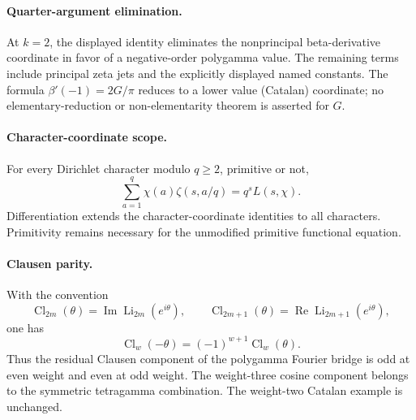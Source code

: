 \paragraph{Quarter-argument elimination.}
At $k=2$, the displayed identity eliminates the nonprincipal beta-derivative
coordinate in favor of a negative-order polygamma value. The remaining terms
include principal zeta jets and the explicitly displayed named constants.
The formula $\beta'(-1)=2G/\pi$ reduces to a lower value (Catalan) coordinate;
no elementary-reduction or non-elementarity theorem is asserted for $G$.

\paragraph{Character-coordinate scope.}
For every Dirichlet character modulo $q\geq2$, primitive or not,
\[
 \sum_{a=1}^{q}\chi(a)\zeta(s,a/q)=q^sL(s,\chi).
\]
Differentiation extends the character-coordinate identities to all characters.
Primitivity remains necessary for the unmodified primitive functional equation.

\paragraph{Clausen parity.}
With the convention
\[
 \operatorname{Cl}_{2m}(\theta)=\operatorname{Im}
       \operatorname{Li}_{2m}(e^{i\theta}),\qquad
 \operatorname{Cl}_{2m+1}(\theta)=\operatorname{Re}
       \operatorname{Li}_{2m+1}(e^{i\theta}),
\]
one has
\[
 \operatorname{Cl}_{w}(-\theta)=(-1)^{w+1}
       \operatorname{Cl}_{w}(\theta).
\]
Thus the residual Clausen component of the polygamma Fourier bridge is odd at
even weight and even at odd weight. The weight-three cosine component belongs
to the symmetric tetragamma combination. The weight-two Catalan example is
unchanged.

